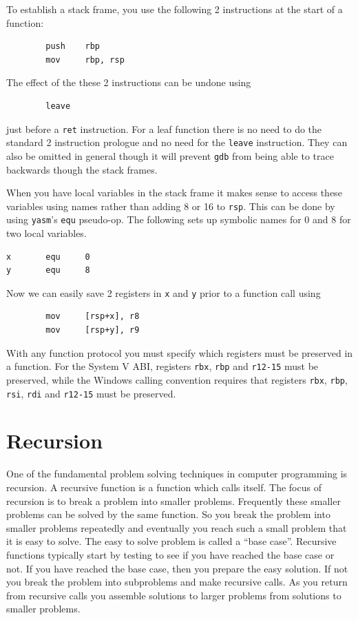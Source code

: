 \documentclass[11pt,b5paper]{book}
\begin{document}
To establish a stack frame, you use the following 2 instructions at the
start of a function:
\begin{verbatim}
        push    rbp
        mov     rbp, rsp
\end{verbatim}
The effect of the these 2 instructions can be undone using
\begin{verbatim}
        leave
\end{verbatim}
just before a {\tt ret} instruction.
For a leaf function there is no need to do the standard 2 instruction
prologue and no need for the {\tt leave} instruction.
They can also be omitted in general though it will prevent {\tt gdb} from
being able to trace backwards though the stack frames.

When you have local variables in the stack frame it makes sense to access these variables using names rather than adding 8 or 16 to {\tt rsp}.
This can be done by using {\tt yasm}'s {\tt equ} pseudo-op.
The following sets up symbolic names for 0 and 8 for two local variables.
\begin{verbatim}
x       equ     0
y       equ     8
\end{verbatim}
Now we can easily save 2 registers in {\tt x} and {\tt y} prior to a function call using
\begin{verbatim}
        mov     [rsp+x], r8
        mov     [rsp+y], r9
\end{verbatim}

With any function protocol you must specify which registers must be preserved in a function. 
For the System V ABI, registers {\tt rbx}, {\tt rbp} and {\tt r12-15} must be preserved, while the
Windows calling convention requires that registers {\tt rbx}, {\tt rbp}, {\tt rsi}, {\tt rdi} and
{\tt r12-15} must be preserved.

\section{Recursion}

One of the fundamental problem solving techniques in computer programming is recursion. 
A recursive function is a function which calls itself.
The focus of recursion is to break a problem into smaller problems.
Frequently these smaller problems can be solved by the same function.
So you break the problem into smaller problems repeatedly and eventually you reach such a small
problem that it is easy to solve.
The easy to solve problem is called a ``base case''. 
Recursive functions typically start by testing to see if you have reached the base case or not.
If you have reached the base case, then you prepare the easy solution.
If not you break the problem into subproblems and make recursive calls.
As you return from recursive calls you assemble solutions to larger problems from 
solutions to smaller problems.
\end{document}
